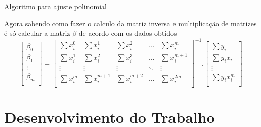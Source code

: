 \documentclass[10pt]{beamer}
\begin{document}
\begin{frame}{Algoritmo para ajuste polinomial}

  Agora sabendo como fazer o calculo da matriz inversa e multiplicação de matrizes é só calcular a matriz $\beta$ de acordo com os dados obtidos
  \[
    \begin{bmatrix}
      \beta_0 \\
      \beta_1 \\
      \vdots  \\
      \beta_m \\
    \end{bmatrix}
    =
    \begin{bmatrix}
      \sum{x_{i}^{0}} & \sum{x_{i}^{1}} & \sum{x_{i}^{2}} & \dots  & \sum{x_{i}^{m}} \\
      \sum{x_{i}^{1}} & \sum{x_{i}^{2}} & \sum{x_{i}^{3}} & \dots & \sum{x_{i}^{m+1}}\\
      \vdots & \vdots & \vdots & \ddots & \vdots \\
      \sum{x_{i}^{m}} & \sum{x_{i}^{m+1}} & \sum{x_{i}^{m+2}} & \dots  & \sum{x_{i}^{2m}} \\
    \end{bmatrix}^{-1}
    .
    \begin{bmatrix}
      \sum{y_{i}} \\
      \sum{y_{i}x_{i}}\\
      \vdots \\
      \sum{y_{i}x_{i}^{m}} \\
    \end{bmatrix}
  \]
\end{frame}

\section{Desenvolvimento do Trabalho}
\end{document}
